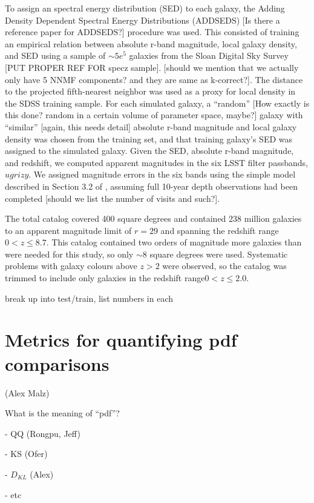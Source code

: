 \documentclass[usenatbib]{mn2e}
\begin{document}
To assign an spectral energy distribution (SED) to each galaxy, the Adding Density Dependent Spectral Energy Distributions (ADDSEDS) [Is there a reference paper for ADDSEDS?] procedure was used.  This consisted of training an empirical relation between absolute r-band magnitude, local galaxy density, and SED using a sample of $\sim 5e^{5}$ galaxies from the Sloan Digital Sky Survey [PUT PROPER REF FOR specz sample]. [should we mention that we actually only have 5 NNMF components? and they are same as k-correct?].  The distance to the projected fifth-nearest neighbor was used as a proxy for local density in the SDSS training sample.  For each simulated galaxy, a ``random'' [How exactly is this done? random in a certain volume of parameter space, maybe?] galaxy with ``similar'' [again, this needs detail] absolute r-band magnitude and local galaxy density was chosen from the training set, and that training galaxy's SED was assigned to the simulated galaxy.  Given the SED, absolute r-band magnitude, and redshift, we computed apparent magnitudes in the six LSST filter passbands, $ugrizy$.  We assigned magnitude errors in the six bands using the simple model described in Section 3.2 of \citet[]{Ivezic:08}, assuming full 10-year depth observations had been completed [should we list the number of visits and such?].


The total catalog covered 400 square degrees and contained 238 million galaxies to an apparent magnitude limit of $r\!=\!29$ and spanning the redshift range $0\!<\!z\!\leq\!8.7$.  This catalog contained two orders of magnitude more galaxies than were needed for this study, so only $\sim\!8$ square degrees were used.  Systematic problems with galaxy colours above $z\!>\!2$ were observed, so the catalog was trimmed to include only galaxies in the redshift range$0\!<\!z\!\leq\!2.0$.  

break up into test/train, list numbers in each



\section{Metrics for quantifying pdf comparisons}\label{metrics}

(Alex Malz)

What is the meaning of “pdf”? 

- QQ (Rongpu, Jeff)

- KS (Ofer)

- $D_{KL}$ (Alex)

- etc
\end{document}
